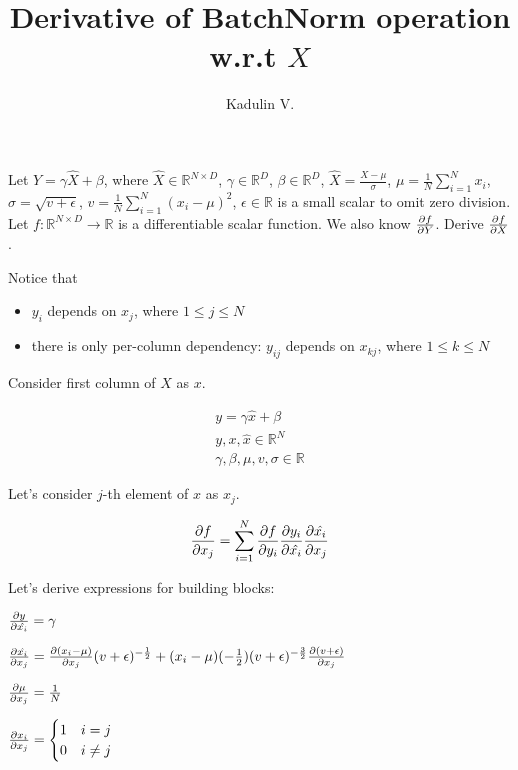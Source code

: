 \documentclass[12pt]{article}
\begin{document}
\title{Derivative of BatchNorm operation w.r.t $X$}
\author{Kadulin V.}
\maketitle

Let $Y = \gamma \hat{X} + \beta$, where 
$\hat{X} \in \mathbb{R}^{N \times D}$, 
$\gamma \in \mathbb{R}^D$, 
$\beta \in \mathbb{R}^D$, 
$\hat{X} = \frac{X - \mu}{\sigma}$, 
$\mu = \frac{1}{N} \sum_{i=1}^{N} x_{i}$,
$\sigma = \sqrt{v + \epsilon}$,
$v = \frac{1}{N} \sum_{i=1}^{N} (x_i - \mu)^2$,
$\epsilon \in \mathbb{R}$ is a small scalar to omit zero division. 
Let $f: \mathbb{R}^{N \times D} \rightarrow \mathbb{R}$ is a differentiable scalar function. We also know $\pdv{f}{Y}$.
Derive $\pdv{f}{X}$.

Notice that
\begin{itemize}
\item $y_i$ depends on $x_j$, where $1 \le j \le N$
\item there is only per-column dependency: $y_{ij}$ depends on $x_{kj}$, where $1 \le k \le N$
\end{itemize}

Consider first column of $X$ as $x$.

\begin{equation*}
\begin{split}
y = \gamma \hat{x} + \beta \\
y, x, \hat{x} \in \mathbb{R}^N \\
\gamma, \beta, \mu, v, \sigma \in \mathbb{R}
\end{split}
\end{equation*}

Let's consider $j$-th element of $x$ as $x_j$.

\[
	\pdv{f}{x_j} = 
	\sum_{i=1}^{N} \pdv{f}{y_i} \pdv{y_i}{\hat{x_i}} \pdv{\hat{x_i}}{x_j}
\]

\newpage

Let's derive expressions for building blocks:

$\pdv{y}{\hat{x_i}} = \gamma$ 

$\pdv{\hat{x_i}}{x_j} = 
\pdv{(x_i - \mu)}{x_j} (v + \epsilon)^{-\frac{1}{2}} + (x_i - \mu) (-\frac{1}{2}) (v + \epsilon)^{-\frac{3}{2}} \pdv{(v + \epsilon)}{x_j}$

$\pdv{\mu}{x_j} = \frac{1}{N}$

$
\pdv{x_i}{x_j} = 
\begin{cases}
1 &\text{$i = j$}\\
0 &\text{$i \ne j$}
\end{cases}
$
\end{document}
